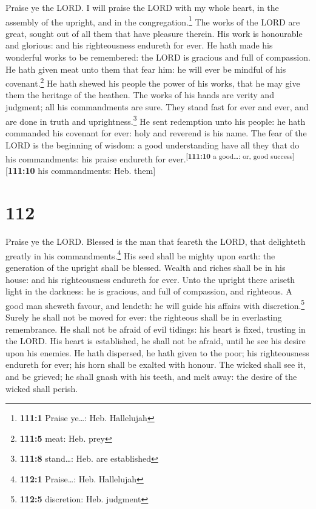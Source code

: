  Praise ye the LORD. I will praise the LORD with my whole
heart, in the assembly of the upright, and in the
congregation.\footnote{\textbf{111:1} Praise ye\ldots: Heb. Hallelujah}
 The works of the LORD are great, sought out of all them
that have pleasure therein.  His work is honourable and
glorious: and his righteousness endureth for ever.  He
hath made his wonderful works to be remembered: the LORD is gracious and
full of compassion.  He hath given meat unto them that
fear him: he will ever be mindful of his covenant.\footnote{\textbf{111:5}
  meat: Heb. prey}  He hath shewed his people the power of
his works, that he may give them the heritage of the heathen.
 The works of his hands are verity and judgment; all his
commandments are sure.  They stand fast for ever and ever,
and are done in truth and uprightness.\footnote{\textbf{111:8}
  stand\ldots: Heb. are established}  He sent redemption
unto his people: he hath commanded his covenant for ever: holy and
reverend is his name.  The fear of the LORD is the
beginning of wisdom: a good understanding have all they that do his
commandments: his praise endureth for
ever.\textsuperscript{{[}\textbf{111:10} a good\ldots: or, good
success{]}}{[}\textbf{111:10} his commandments: Heb. them{]}

\hypertarget{section-111}{%
\section{112}\label{section-111}}

 Praise ye the LORD. Blessed is the man that feareth the
LORD, that delighteth greatly in his commandments.\footnote{\textbf{112:1}
  Praise\ldots: Heb. Hallelujah}  His seed shall be mighty
upon earth: the generation of the upright shall be blessed.
 Wealth and riches shall be in his house: and his
righteousness endureth for ever.  Unto the upright there
ariseth light in the darkness: he is gracious, and full of compassion,
and righteous.  A good man sheweth favour, and lendeth: he
will guide his affairs with discretion.\footnote{\textbf{112:5}
  discretion: Heb. judgment}  Surely he shall not be moved
for ever: the righteous shall be in everlasting remembrance.
 He shall not be afraid of evil tidings: his heart is
fixed, trusting in the LORD.  His heart is established, he
shall not be afraid, until he see his desire upon his enemies.
 He hath dispersed, he hath given to the poor; his
righteousness endureth for ever; his horn shall be exalted with honour.
 The wicked shall see it, and be grieved; he shall gnash
with his teeth, and melt away: the desire of the wicked shall perish.

